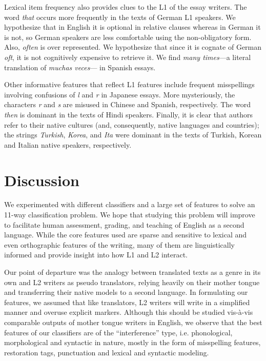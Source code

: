 \documentclass[11pt,letterpaper]{article}
\newcommand{\textnl}{\textit}
\begin{document}
Lexical item frequency also provides clues to the L1 of the essay writers. The word \textnl{that} occurs more frequently in the texts of German
L1 speakers. We hypothesize that in English it is optional in relative
clauses whereas in German it is not, so German speakers are less comfortable using the non-obligatory form.  Also, \textnl{often} is
over represented. We hypothesize that since it is cognate of German \textnl{oft}, it is not
cognitively expensive to retrieve it. We find \textnl{many times}---a literal translation of \textnl{muchas veces}--- in Spanish essays.

Other informative features that reflect L1 features include frequent misspellings involving confusions of \textnl{l} and \textnl{r} in Japanese essays. More mysteriously, the characters \textnl{r} and \textnl{s} are misused in Chinese
and Spanish, respectively. The word \textnl{then} is dominant in the texts of
Hindi speakers. Finally, it is clear that authors refer to their
native cultures (and, consequently, native languages and countries);
the strings \textnl{Turkish}, \textnl{Korea}, and \textnl{Ita} were
dominant in the texts of Turkish, Korean and Italian native speakers,
respectively.

\section{Discussion}
\label{sec:discussion}

We experimented with different classifiers and a large set of features to solve an 11-way classification problem. We hope that studying this problem will improve to facilitate human assessment, grading, and teaching of English as a second language. While the core features used are sparse and sensitive to lexical and even orthographic features of the writing, many of them are linguistically informed and provide insight into how L1 and L2 interact.  

Our point of departure was the analogy between translated texts as a genre in its own and L2 writers as pseudo translators, relying heavily on their mother tongue and transferring their native models to a second language. In formulating our features, we assumed that like translators, L2 writers will write in a simplified manner and overuse explicit markers. Although this should be studied vis-\`{a}-vis comparable outputs of mother tongue writers in English, we observe that the best features of our classifiers are of the ``interference'' type, i.e. phonological, morphological and syntactic in nature, mostly in the form of misspelling features, restoration tags, punctuation and lexical and syntactic modeling.
\end{document}
